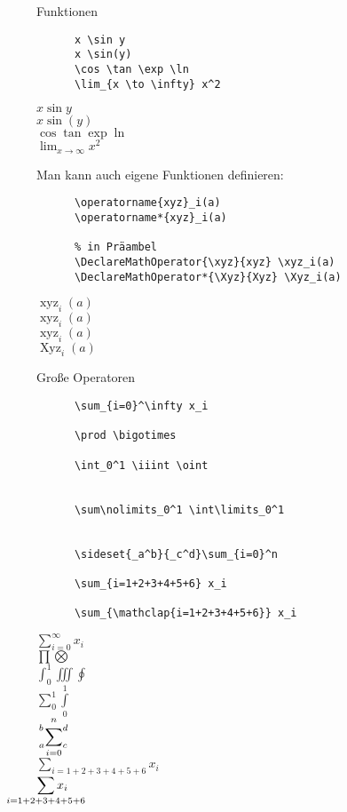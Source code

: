 \begin{frame}[fragile]{Funktionen}
  \begin{CodeExample}{0.70}
    \begin{lstlisting}
      x \sin y
      x \sin(y)
      \cos \tan \exp \ln
      \lim_{x \to \infty} x^2
    \end{lstlisting}
  \CodeResult
    $x \sin y$ \\
    $x \sin(y)$ \\
    $\cos \tan \exp \ln$ \\
    $\displaystyle \lim_{x \to \infty} x^2$
  \end{CodeExample}
  \vspace{5pt}
  Man kann auch eigene Funktionen definieren:
  \vspace{-1em}
  \begin{CodeExample}{0.70}
    \begin{lstlisting}
      \operatorname{xyz}_i(a)
      \operatorname*{xyz}_i(a)

      % in Präambel
      \DeclareMathOperator{\xyz}{xyz} \xyz_i(a)
      \DeclareMathOperator*{\Xyz}{Xyz} \Xyz_i(a)
    \end{lstlisting}
  \CodeResult
    $\operatorname{xyz}_i(a)$ \\
    $\displaystyle \operatorname*{xyz}_i(a)$ \\[\baselineskip]
    $\operatorname{xyz}_i(a)$ \\
    $\displaystyle \operatorname*{Xyz}_i(a)$
  \end{CodeExample}
\end{frame}

\begin{frame}[fragile]{Große Operatoren}
  \begin{CodeExample}{0.70}
    \begin{lstlisting}
      \sum_{i=0}^\infty x_i

      \prod \bigotimes

      \int_0^1 \iiint \oint


      \sum\nolimits_0^1 \int\limits_0^1


      \sideset{_a^b}{_c^d}\sum_{i=0}^n

      \sum_{i=1+2+3+4+5+6} x_i

      \sum_{\mathclap{i=1+2+3+4+5+6}} x_i
    \end{lstlisting}
  \CodeResult
    $\displaystyle \sum_{i=0}^\infty x_i$ \\
    $\displaystyle \prod \bigotimes$ \\
    $\displaystyle \int_0^1 \iiint \oint$  \\
    $\displaystyle \sum\nolimits_0^1 \int\limits_0^1$ \\
    $\displaystyle \sideset{_a^b}{_c^d}\sum_{i=0}^n$ \\
    $\displaystyle \sum_{i=1+2+3+4+5+6} x_i$ \\
    \hspace*{0.75cm}$\displaystyle \sum_{\mathclap{i=1+2+3+4+5+6}} x_i$
  \end{CodeExample}
\end{frame}

